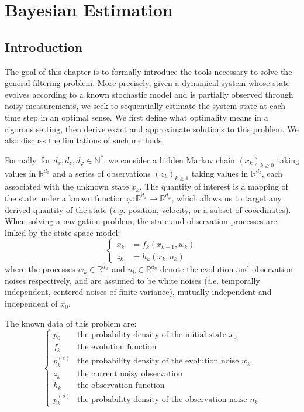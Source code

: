 \chapter{Bayesian Estimation}\label{sec:Bayesian_estimation}

\vfill
\localtableofcontents
\vfill
\newpage

\section{Introduction}

The goal of this chapter is to formally introduce the tools necessary to solve the general filtering problem. More precisely, given a dynamical system whose state evolves according to a known stochastic model and is partially observed through noisy measurements, we seek to sequentially estimate the system state at each time step in an optimal sense. We first define what optimality means in a rigorous setting, then derive exact and approximate solutions to this problem. We also discuss the limitations of such methods.

Formally, for $d_x,d_z,d_{\varphi}\in\mathbb{N}^*$, we consider a hidden Markov chain $(x_k)_{k\geq0}$ taking values in $\mathbb{R}^{d_x}$ and a series of observations $(z_k)_{k\geq1}$ taking values in $\mathbb{R}^{d_z}$, each associated with the unknown state $x_k$. The quantity of interest is a mapping of the state under a known function $\varphi:\mathbb{R}^{d_x}\to\mathbb{R}^{d_{\varphi}}$, which allows us to target any derived quantity of the state (\textit{e.g.} position, velocity, or a subset of coordinates). When solving a navigation problem, the state and observation processes are linked by the state-space model:
\begin{equation}
	\left\{\begin{aligned}
	x_k&=f_k(x_{k-1},w_k)\\
	z_k&=h_k(x_k,n_k)
	\end{aligned}\right.\label{eq:navigation_problem}
\end{equation}
where the processes $w_k\in\mathbb{R}^{d_w}$ and $n_k\in\mathbb{R}^{d_n}$ denote the evolution and observation noises respectively, and are assumed to be white noises (\textit{i.e.} temporally independent, centered noises of finite variance), mutually independent and independent of $x_0$.

The known data of this problem are:
\begin{equation}
	\left\{\begin{array}{ll}
	p_0&\text{the probability density of the initial state }x_0\\
	f_k&\text{the evolution function}\\
	p_k^{(e)}&\text{the probability density of the evolution noise }w_k\\
	z_k&\text{the current noisy observation}\\
	h_k&\text{the observation function}\\
	p_k^{(o)}&\text{the probability density of the observation noise }n_k
	\end{array}\right.
\end{equation}

